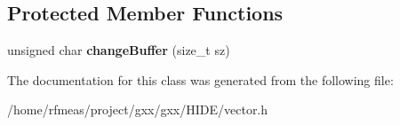 \subsection*{Protected Member Functions}
\begin{DoxyCompactItemize}
\item 
unsigned char {\bfseries change\+Buffer} (size\+\_\+t sz)\hypertarget{classgxx_1_1vector_a096412be01a6cee0880cf725ba191eb4}{}\label{classgxx_1_1vector_a096412be01a6cee0880cf725ba191eb4}

\end{DoxyCompactItemize}


The documentation for this class was generated from the following file\+:\begin{DoxyCompactItemize}
\item 
/home/rfmeas/project/gxx/gxx/\+H\+I\+D\+E/vector.\+h\end{DoxyCompactItemize}
